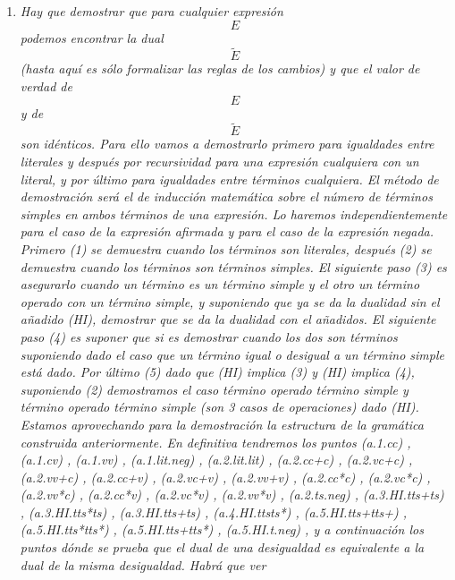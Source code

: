 \documentclass[
]{article}
\begin{document}
\begin{enumerate}
\begin{enumerate}
\begin{enumerate}
\begin{enumerate}
        \begin{enumerate}
        \def\labelenumv{\arabic{enumv}.}
        \item
          \emph{Hay que demostrar que para cualquier expresión
          \[E\]pode\-mos encontrar la dual \[\widetilde{E}\](hasta aquí
          es sólo formalizar las reglas de los cambios) y que el valor
          de verdad de \[E\] y de \[\widetilde{E}\] son idénticos. Para
          ello vamos a demos\-trarlo primero para igualdades entre
          literales y des\-pués por recursividad para una expresión
          cualquiera con un literal, y por último para igualdades entre
          términos cualquiera. El método de demostración será el de
          induc\-ción matemática sobre el número de términos simples en
          ambos términos de una expresión. Lo haremos
          indepen\-dientemente para el caso de la expresión afirmada y
          para el caso de la expresión negada. Primero (1) se
          de\-muestra cuando los términos son literales, después (2) se
          demuestra cuando los términos son términos simples. El
          siguiente paso (3) es asegurarlo cuando un término es un
          término simple y el otro un término operado con un término
          simple, y suponiendo que ya se da la duali\-dad sin el añadido
          (HI), demostrar que se da la duali\-dad con el añadidos. El
          siguiente paso (4) es suponer que si es demostrar cuando los
          dos son términos supo\-niendo dado el caso que un término
          igual o desigual a un término simple está dado. Por último (5)
          dado que (HI) implica (3) y (HI) implica (4), suponiendo (2)
          de\-mostramos el caso término operado término simple y
          tér\-mino operado término simple (son 3 casos de
          operacio\-nes) dado (HI). Estamos aprovechando para la
          demostra\-ción la estructura de la gramática construida
          anterior\-mente. En definitiva tendremos los puntos (a.1.cc) ,
          (a.1.cv) , (a.1.vv) , (a.1.lit.neg) , (a.2.lit.lit) ,
          (a.2.cc+c) , (a.2.vc+c) , (a.2.vv+c) , (a.2.cc+v) , (a.2.vc+v)
          , (a.2.vv+v) , (a.2.cc*c) , (a.2.vc*c) , (a.2.vv*c) ,
          (a.2.cc*v) , (a.2.vc*v) , (a.2.vv*v) , (a.2.ts.neg) ,
          (a.3.HI.tts+ts) , (a.3.HI.tts*ts) , (a.3.HI.tts+ts) ,
          (a.4.HI.ttsts*) , (a.5.HI.tts+tts+) , (a.5.HI.tts*tts*) ,
          (a.5.HI.tts+tts*) , (a.5.HI.t.neg) , y a continuación los
          puntos dónde se prueba que el dual de una desigual\-dad es
          equivalente a la dual de la misma desigualdad. Habrá que ver
}
\end{enumerate}
\end{enumerate}
\end{enumerate}
\end{enumerate}
\end{enumerate}
\end{document}
